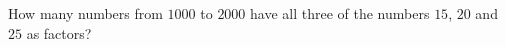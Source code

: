How many numbers from $1000$ to $2000$ have all three of the numbers $15$, $20$ and $25$ as factors?
